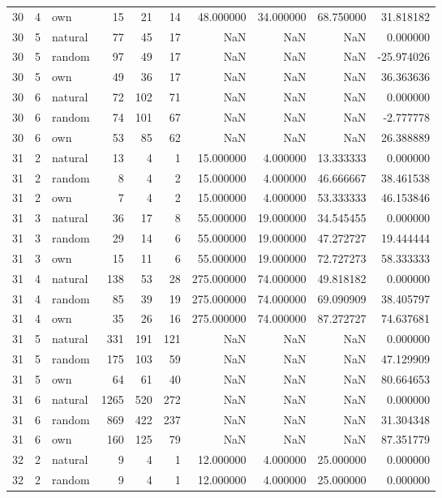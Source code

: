 \begin{table}[htbp]
\begin{tabular}{rrlrrrrrrr}
30 & 4 & own & 15 & 21 & 14 & 48.000000 & 34.000000 & 68.750000 & 31.818182 \\
30 & 5 & natural & 77 & 45 & 17 & NaN & NaN & NaN & 0.000000 \\
30 & 5 & random & 97 & 49 & 17 & NaN & NaN & NaN & -25.974026 \\
30 & 5 & own & 49 & 36 & 17 & NaN & NaN & NaN & 36.363636 \\
30 & 6 & natural & 72 & 102 & 71 & NaN & NaN & NaN & 0.000000 \\
30 & 6 & random & 74 & 101 & 67 & NaN & NaN & NaN & -2.777778 \\
30 & 6 & own & 53 & 85 & 62 & NaN & NaN & NaN & 26.388889 \\
31 & 2 & natural & 13 & 4 & 1 & 15.000000 & 4.000000 & 13.333333 & 0.000000 \\
31 & 2 & random & 8 & 4 & 2 & 15.000000 & 4.000000 & 46.666667 & 38.461538 \\
31 & 2 & own & 7 & 4 & 2 & 15.000000 & 4.000000 & 53.333333 & 46.153846 \\
31 & 3 & natural & 36 & 17 & 8 & 55.000000 & 19.000000 & 34.545455 & 0.000000 \\
31 & 3 & random & 29 & 14 & 6 & 55.000000 & 19.000000 & 47.272727 & 19.444444 \\
31 & 3 & own & 15 & 11 & 6 & 55.000000 & 19.000000 & 72.727273 & 58.333333 \\
31 & 4 & natural & 138 & 53 & 28 & 275.000000 & 74.000000 & 49.818182 & 0.000000 \\
31 & 4 & random & 85 & 39 & 19 & 275.000000 & 74.000000 & 69.090909 & 38.405797 \\
31 & 4 & own & 35 & 26 & 16 & 275.000000 & 74.000000 & 87.272727 & 74.637681 \\
31 & 5 & natural & 331 & 191 & 121 & NaN & NaN & NaN & 0.000000 \\
31 & 5 & random & 175 & 103 & 59 & NaN & NaN & NaN & 47.129909 \\
31 & 5 & own & 64 & 61 & 40 & NaN & NaN & NaN & 80.664653 \\
31 & 6 & natural & 1265 & 520 & 272 & NaN & NaN & NaN & 0.000000 \\
31 & 6 & random & 869 & 422 & 237 & NaN & NaN & NaN & 31.304348 \\
31 & 6 & own & 160 & 125 & 79 & NaN & NaN & NaN & 87.351779 \\
32 & 2 & natural & 9 & 4 & 1 & 12.000000 & 4.000000 & 25.000000 & 0.000000 \\
32 & 2 & random & 9 & 4 & 1 & 12.000000 & 4.000000 & 25.000000 & 0.000000 \\

\end{tabular}
\end{table}
